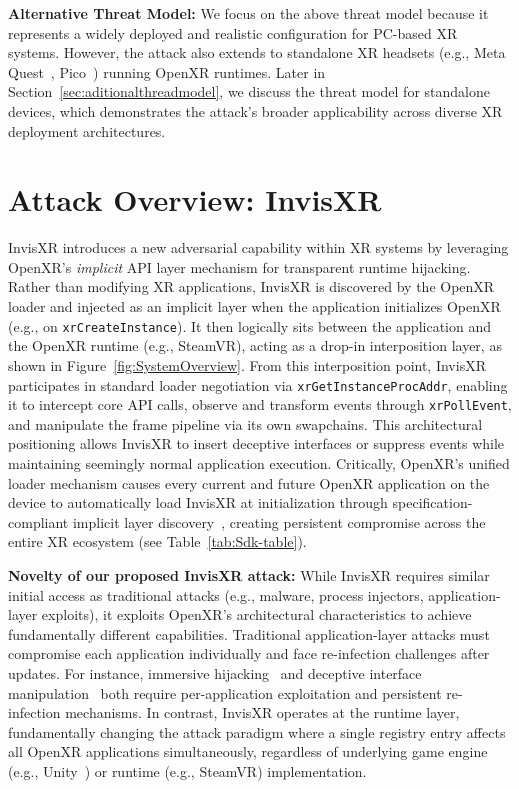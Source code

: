 \documentclass[letterpaper,twocolumn,10pt]{article}
\begin{document}
\textbf{Alternative Threat Model:} We focus on the above threat model because it represents a widely deployed and realistic configuration for PC-based XR systems. However, the attack also extends to standalone XR headsets (e.g., Meta Quest~\cite{metaquestDevice}, Pico~\cite{pico4Device}) running OpenXR runtimes. Later in Section~\ref{sec:aditionalthreadmodel}, we discuss the threat model for standalone devices, which demonstrates the attack's broader applicability across diverse XR deployment architectures.

\section{Attack Overview: InvisXR}
InvisXR introduces a new adversarial capability within XR systems by leveraging OpenXR's \emph{implicit} API layer mechanism for transparent runtime hijacking. Rather than modifying XR applications, InvisXR is discovered by the OpenXR loader and injected as an implicit layer when the application initializes OpenXR (e.g., on \texttt{xrCreateInstance}). It then logically sits between the application and the OpenXR runtime (e.g., SteamVR), acting as a drop-in interposition layer, as shown in Figure~\ref{fig:SystemOverview}. From this interposition point, InvisXR participates in standard loader negotiation via \texttt{xrGetInstanceProcAddr}, enabling it to intercept core API calls, observe and transform events through \texttt{xrPollEvent}, and manipulate the frame pipeline via its own swapchains. This architectural positioning allows InvisXR to insert deceptive interfaces or suppress events while maintaining seemingly normal application execution. Critically, OpenXR's unified loader mechanism causes every current and future OpenXR application on the device to automatically load InvisXR at initialization through specification-compliant implicit layer discovery~\cite{khronosOpenXR}, creating persistent compromise across the entire XR ecosystem (see Table~\ref{tab:Sdk-table}).

\textbf{Novelty of our proposed InvisXR attack:} While InvisXR requires similar initial access as traditional attacks (e.g., malware, process injectors, application-layer exploits), it exploits OpenXR's architectural characteristics to achieve fundamentally different capabilities. Traditional application-layer attacks must compromise each application individually and face re-infection challenges after updates. For instance, immersive hijacking~\cite{yang2024inception} and deceptive interface manipulation~\cite{nair2022exploring} both require per-application exploitation and persistent re-infection mechanisms. In contrast, InvisXR operates at the runtime layer, fundamentally changing the attack paradigm where a single registry entry affects all OpenXR applications simultaneously, regardless of underlying game engine (e.g., Unity~\cite{unity}) or runtime (e.g., SteamVR) implementation.
\end{document}
